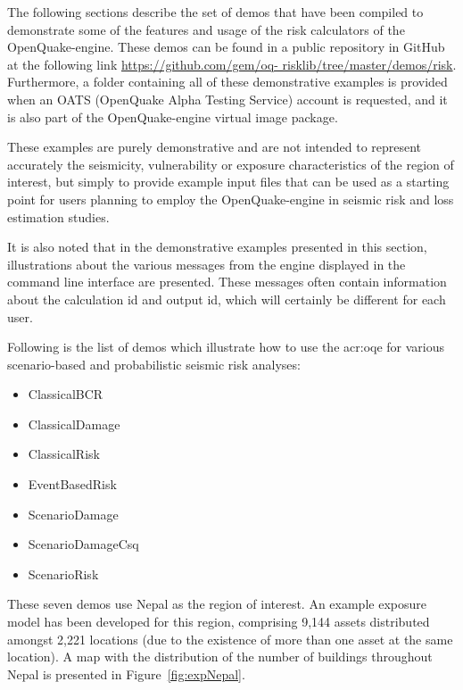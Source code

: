 The following sections describe the set of demos that have been compiled to
demonstrate some of the features and usage of the risk calculators of the
OpenQuake-engine. These demos can be found in a public repository in GitHub at
the following link \href{https://github.com/gem/oq-
risklib/tree/master/demos/risk}{https://github.com/gem/oq-
risklib/tree/master/demos/risk}. Furthermore, a folder containing all of these
demonstrative examples is provided when an OATS (OpenQuake Alpha Testing
Service) account is requested, and it is also part of the OpenQuake-engine
virtual image package.

These examples are purely demonstrative and are not intended to represent
accurately the seismicity, vulnerability or exposure characteristics of the
region of interest, but simply to provide example input files that can be used
as a starting point for users planning to employ the OpenQuake-engine in seismic
risk and loss estimation studies.

It is also noted that in the demonstrative examples presented in this section,
illustrations about the various messages from the engine displayed in the
command line interface are presented. These messages often contain information
about the calculation id and output id, which will certainly be different for
each user.

Following is the list of demos which illustrate how to use the \gls{acr:oqe} for
various scenario-based and probabilistic seismic risk analyses:

\begin{itemize}

    \item ClassicalBCR
	\item ClassicalDamage
    \item ClassicalRisk
    \item EventBasedRisk
    \item ScenarioDamage
    \item ScenarioDamageCsq
    \item ScenarioRisk

\end{itemize}

These seven demos use Nepal as the region of interest. An example \gls{exposure
model} has been developed for this region, comprising 9,144 assets distributed
amongst 2,221 locations (due to the existence of more than one \gls{asset} at
the same location). A map with the distribution of the number of buildings
throughout Nepal is presented in Figure~\ref{fig:expNepal}.

